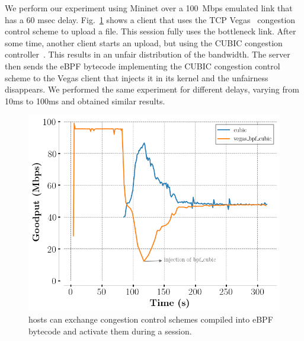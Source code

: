 We perform our experiment using Mininet over a 100~Mbps emulated link
that has a 60 msec delay.
Fig.~\ref{fig:vegasCubic} shows a client that uses the TCP
Vegas~\cite{10.1145/190314.190317} congestion control scheme to upload a file.
This \tcpls session fully uses the bottleneck link. After some time, another
client starts an upload, but using the CUBIC congestion
controller~\cite{rfc8312}. This results in an unfair distribution of the
bandwidth. The server then sends the eBPF bytecode implementing the CUBIC congestion
control scheme to the \tcp Vegas client that injects it in its kernel and the
unfairness disappears. We performed the same experiment for different delays,
varying from 10ms to 100ms and obtained similar results.

\begin{figure}[!t]
  \begin{center}
    \includegraphics[width=\columnwidth]{pretty_plotify/plots/vegas_cubic.png}
  \end{center}
\vspace{-0.5cm}
  \caption{\tcpls hosts can exchange congestion control schemes compiled into eBPF bytecode and activate them during a \tcpls session.}
  \label{fig:vegasCubic}
\end{figure}

